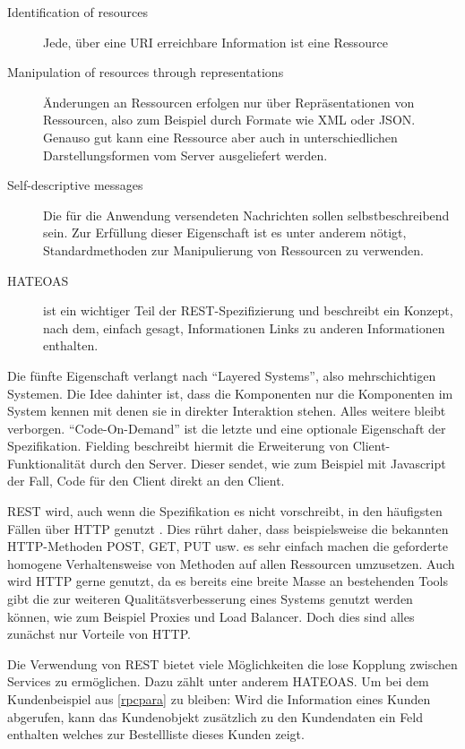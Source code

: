 \documentclass[12pt,a4paper,bibliography=totocnumbered,listof=totocnumbered]{scrartcl}
\begin{document}
\begin{description}  
	\item [Identification of resources] Jede, über eine URI erreichbare Information ist eine Ressource
	\item [Manipulation of resources through representations] Änderungen an Ressourcen erfolgen nur über Repräsentationen von Ressourcen, also zum Beispiel durch Formate wie XML oder JSON. Genauso gut kann eine Ressource aber auch in unterschiedlichen Darstellungsformen vom Server ausgeliefert werden.
	\item [Self-descriptive messages] Die für die Anwendung versendeten Nachrichten sollen selbstbeschreibend sein. Zur Erfüllung dieser Eigenschaft ist es unter anderem nötigt, Standardmethoden zur Manipulierung von Ressourcen zu verwenden.
	\item [\acf{HATEOAS}] ist ein wichtiger Teil der REST-Spezifizierung und beschreibt ein Konzept, nach dem, einfach gesagt, Informationen Links zu anderen Informationen enthalten. 
\end{description}


Die fünfte Eigenschaft verlangt nach \enquote{Layered Systems}, also mehrschichtigen Systemen. Die Idee dahinter ist, dass die Komponenten nur die Komponenten im System kennen mit denen sie in direkter Interaktion stehen. Alles weitere bleibt verborgen.
\enquote{Code-On-Demand} ist die letzte und eine optionale Eigenschaft der Spezifikation. Fielding beschreibt hiermit die Erweiterung von Client-Funktionalität durch den Server. Dieser sendet, wie zum Beispiel mit Javascript der Fall, Code für den Client direkt an den Client.\cite{fielding}

REST wird, auch wenn die Spezifikation es nicht vorschreibt, in den häufigsten Fällen über HTTP genutzt \cite[S.97]{buildingms}. Dies rührt daher, dass beispielsweise die bekannten HTTP-Methoden POST, GET, PUT usw. es sehr einfach machen die geforderte homogene Verhaltensweise von Methoden auf allen Ressourcen umzusetzen. Auch wird HTTP gerne genutzt, da es bereits eine breite Masse an bestehenden Tools gibt die zur weiteren Qualitätsverbesserung eines Systems genutzt werden können, wie zum Beispiel Proxies und Load Balancer. Doch dies sind alles zunächst nur Vorteile von HTTP.

Die Verwendung von REST bietet viele Möglichkeiten die lose Kopplung zwischen Services zu ermöglichen. Dazu zählt unter anderem \ac{HATEOAS}. Um bei dem Kundenbeispiel aus \ref{rpcpara} zu bleiben: Wird die Information eines Kunden abgerufen, kann das Kundenobjekt zusätzlich zu den Kundendaten ein Feld enthalten welches zur Bestellliste dieses Kunden zeigt.
\end{document}
